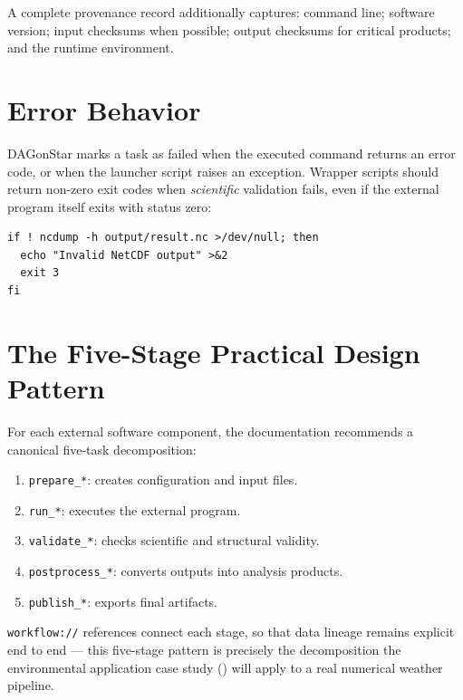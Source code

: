 A complete provenance record additionally captures: command line; software
version; input checksums when possible; output checksums for critical
products; and the runtime environment.

\section{Error Behavior}

DAGonStar marks a task as failed when the executed command returns an error
code, or when the launcher script raises an exception. Wrapper scripts
should return non-zero exit codes when \emph{scientific} validation fails,
even if the external program itself exits with status zero:

\begin{lstlisting}[style=bash]
if ! ncdump -h output/result.nc >/dev/null; then
  echo "Invalid NetCDF output" >&2
  exit 3
fi
\end{lstlisting}

\section{The Five-Stage Practical Design Pattern}

For each external software component, the documentation recommends a
canonical five-task decomposition:

\begin{enumerate}[leftmargin=1.6em]
  \item \texttt{prepare\_*}: creates configuration and input files.
  \item \texttt{run\_*}: executes the external program.
  \item \texttt{validate\_*}: checks scientific and structural validity.
  \item \texttt{postprocess\_*}: converts outputs into analysis products.
  \item \texttt{publish\_*}: exports final artifacts.
\end{enumerate}

\texttt{workflow://} references connect each stage, so that data lineage
remains explicit end to end --- this five-stage pattern is precisely the
decomposition the environmental application case study ()
will apply to a real numerical weather pipeline.

